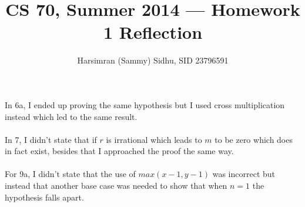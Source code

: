 \documentclass[11pt,letterpaper]{article}
\title{CS 70, Summer 2014 --- Homework 1 Reflection} %
\author{Harsimran (Sammy) Sidhu, SID 23796591} %
\begin{document}
\maketitle

In 6a, I ended up proving the same hypothesis but I used cross multiplication instead which led to the same result.\\
\\
In 7, I didn't state that if $r$ is irrational which leads to $m$ to be zero which does in fact exist, besides that I approached the proof the same way.\\
\\
For 9a, I didn't state that the use of $max(x-1,y-1)$ was incorrect but instead that another base case was needed to show that when $n=1$ the hypothesis falls apart.
\end{document}
